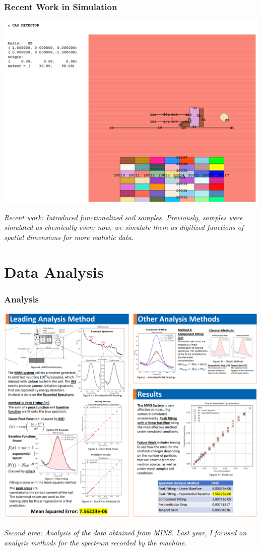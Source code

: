 \documentclass[notheorems,11pt,compress]{beamer}
\begin{document}
\begin{frame}
\frametitle{Recent Work in Simulation}
\begin{center}
\includegraphics[width=0.7\linewidth]{7x7x7inmcnp.png}
\end{center}
\small
\textit{Recent work: Introduced functionalized soil samples. Previously, samples were simulated as chemically even; now, we simulate them as digitized functions of spatial dimensions for more realistic data.}
\end{frame}

\section{Data Analysis}

\begin{frame}
\frametitle{Analysis}
\begin{center}
\includegraphics[width=0.7\linewidth]{analysismethods.png}
\end{center}
\small
\textit{Second area: Analysis of the data obtained from MINS. Last year, I focused on analysis methods for the spectrum recorded by the machine.}
\end{frame}
\end{document}
